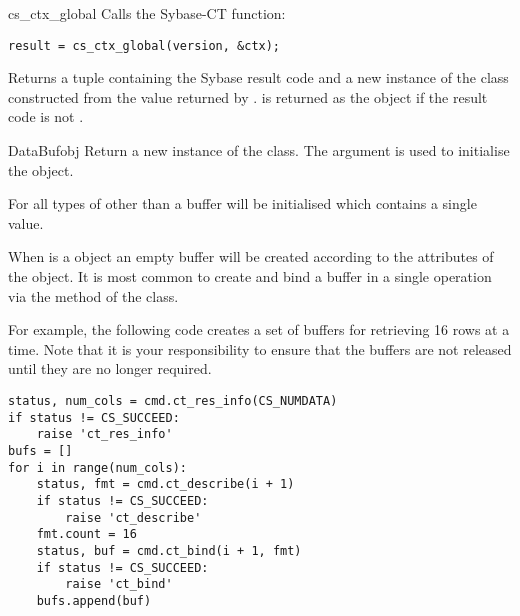 \begin{funcdesc}{cs_ctx_global}{}
Calls the Sybase-CT  function:

\begin{verbatim}
result = cs_ctx_global(version, &ctx);
\end{verbatim}

Returns a tuple containing the Sybase result code and a new instance
of the  class constructed from the  value
returned by .   is returned as the
 object if the result code is not .
\end{funcdesc}

\begin{funcdesc}{DataBuf}{obj}
Return a new instance of the  class.  The 
argument is used to initialise the  object.

For all types of  other than  a buffer will
be initialised which contains a single value.

When  is a  object an empty buffer will be
created according to the attributes of the  object.
It is most common to create and bind a buffer in a single operation
via the  method of the  class.

For example, the following code creates a set of buffers for
retrieving 16 rows at a time.  Note that it is your responsibility to
ensure that the buffers are not released until they are no longer
required.

\begin{verbatim}
status, num_cols = cmd.ct_res_info(CS_NUMDATA)
if status != CS_SUCCEED:
    raise 'ct_res_info'
bufs = []
for i in range(num_cols):
    status, fmt = cmd.ct_describe(i + 1)
    if status != CS_SUCCEED:
        raise 'ct_describe'
    fmt.count = 16
    status, buf = cmd.ct_bind(i + 1, fmt)
    if status != CS_SUCCEED:
        raise 'ct_bind'
    bufs.append(buf)
\end{verbatim}
\end{funcdesc}

